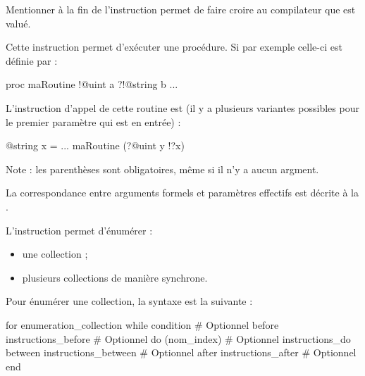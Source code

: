 {Mentionner  à la fin de l'instruction  permet de faire croire au compilateur que  est valué.




Cette instruction permet d'exécuter une procédure. Si par exemple celle-ci est définie par :
\begin{galgascode}
proc maRoutine !@uint a ?!@string b {
  ...
}
\end{galgascode}

L'instruction d'appel de cette routine est (il y a plusieurs variantes possibles pour le premier paramètre qui est en entrée) :
\begin{galgascode}
@string x = ...
maRoutine (?@uint y !?x)
\end{galgascode}

Note : les parenthèses sont obligatoires, même si il n'y a aucun argment.

La correspondance entre arguments formels et paramètres effectifs est décrite à la .





L'instruction  permet d'énumérer :
\begin{itemize}
  \item une collection ;
  \item plusieurs collections de manière synchrone.
\end{itemize}

Pour énumérer une collection, la syntaxe est la suivante :

\begin{galgascode}
for enumeration_collection
while condition # Optionnel
before instructions_before  # Optionnel
do 
  (nom_index) # Optionnel
  instructions_do
between instructions_between  # Optionnel
after instructions_after  # Optionnel
end
\end{galgascode}


}
